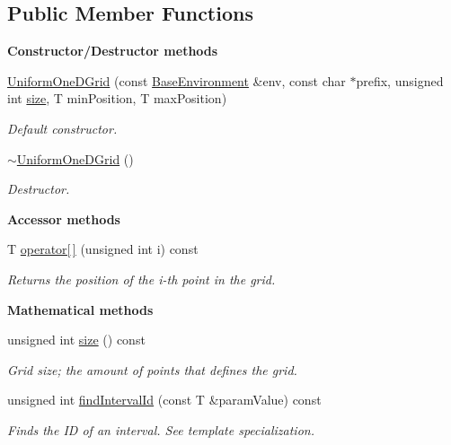 \subsection*{Public Member Functions}
\begin{Indent}{\bf Constructor/\-Destructor methods}\par
\begin{DoxyCompactItemize}
\item 
\hyperlink{class_q_u_e_s_o_1_1_uniform_one_d_grid_aedd7bcaf0aec01d5c97c4f31f2b3d357}{Uniform\-One\-D\-Grid} (const \hyperlink{class_q_u_e_s_o_1_1_base_environment}{Base\-Environment} \&env, const char $\ast$prefix, unsigned int \hyperlink{class_q_u_e_s_o_1_1_uniform_one_d_grid_a66a0589eb7da47895f2bab97b916fca4}{size}, T min\-Position, T max\-Position)
\begin{DoxyCompactList}\small\item\em Default constructor. \end{DoxyCompactList}\item 
\hyperlink{class_q_u_e_s_o_1_1_uniform_one_d_grid_a2cfd6fdc7085bd667e18cef6771cf930}{$\sim$\-Uniform\-One\-D\-Grid} ()
\begin{DoxyCompactList}\small\item\em Destructor. \end{DoxyCompactList}\end{DoxyCompactItemize}
\end{Indent}
\begin{Indent}{\bf Accessor methods}\par
\begin{DoxyCompactItemize}
\item 
T \hyperlink{class_q_u_e_s_o_1_1_uniform_one_d_grid_a2fe101c8fbce7a6ac00b07781c2c6b6e}{operator\mbox{[}$\,$\mbox{]}} (unsigned int i) const 
\begin{DoxyCompactList}\small\item\em Returns the position of the i-\/th point in the grid. \end{DoxyCompactList}\end{DoxyCompactItemize}
\end{Indent}
\begin{Indent}{\bf Mathematical methods}\par
\begin{DoxyCompactItemize}
\item 
unsigned int \hyperlink{class_q_u_e_s_o_1_1_uniform_one_d_grid_a66a0589eb7da47895f2bab97b916fca4}{size} () const 
\begin{DoxyCompactList}\small\item\em Grid size; the amount of points that defines the grid. \end{DoxyCompactList}\item 
unsigned int \hyperlink{class_q_u_e_s_o_1_1_uniform_one_d_grid_afa2a0d3a54ce7fed0610a81337dfeae7}{find\-Interval\-Id} (const T \&param\-Value) const 
\begin{DoxyCompactList}\small\item\em Finds the I\-D of an interval. See template specialization. \end{DoxyCompactList}\end{DoxyCompactItemize}
\end{Indent}
